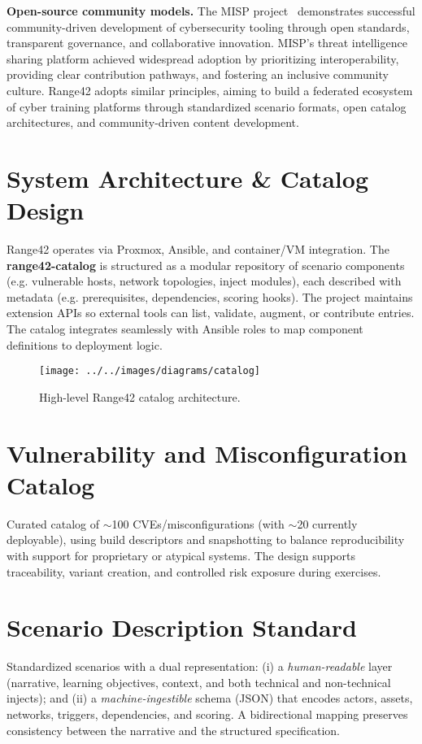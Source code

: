\documentclass[11pt]{article}
\begin{document}
\textbf{Open-source community models.}
The MISP project~\cite{misp} demonstrates successful community-driven development of cybersecurity tooling through open standards, transparent governance, and collaborative innovation.
MISP's threat intelligence sharing platform achieved widespread adoption by prioritizing interoperability, providing clear contribution pathways, and fostering an inclusive community culture.
Range42 adopts similar principles, aiming to build a federated ecosystem of cyber training platforms through standardized scenario formats, open catalog architectures, and community-driven content development.

\section{System Architecture \& Catalog Design}
Range42 operates via Proxmox, Ansible, and container/VM integration.  
The \textbf{range42-catalog} is structured as a modular repository of scenario components (e.g. vulnerable hosts, network topologies, inject modules), each described with metadata (e.g. prerequisites, dependencies, scoring hooks). The project maintains extension APIs so external tools can list, validate, augment, or contribute entries. The catalog integrates seamlessly with Ansible roles to map component definitions to deployment logic.

\begin{figure}[h]
\centering
\texttt{[image: ../../images/diagrams/catalog]}
\caption{High-level Range42 catalog architecture.}
\label{fig:arch_catalog}
\end{figure}

\section{Vulnerability and Misconfiguration Catalog}
Curated catalog of $\sim$100 CVEs/misconfigurations (with $\sim$20 currently deployable), using build descriptors and snapshotting to balance reproducibility with support for proprietary or atypical systems. The design supports traceability, variant creation, and controlled risk exposure during exercises.

\section{Scenario Description Standard}

Standardized scenarios with a dual representation:
(i) a \emph{human-readable} layer (narrative, learning objectives, context, and both technical and non-technical injects); and
(ii) a \emph{machine-ingestible} schema (JSON) that encodes actors, assets, networks, triggers, dependencies, and scoring.
A bidirectional mapping preserves consistency between the narrative and the structured specification.
\end{document}
